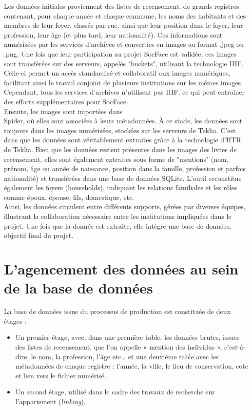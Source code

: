 Les données initiales proviennent des listes de recensement, de grands registres contenant, pour chaque année et chaque commune, les noms des habitants et des membres de leur foyer, classés par rue, ainsi que leur position dans le foyer, leur profession, leur âge (et plus tard, leur nationalité). Ces informations sont numérisées par les services d’archives et converties en images au format .jpeg ou .png. Une fois que leur participation au projet SocFace est validée, ces images sont transférées sur des serveurs, appelés "buckets", utilisant la technologie \gls{IIIF}. Celle-ci permet un accès standardisé et collaboratif aux images numériques, facilitant ainsi le travail conjoint de plusieurs institutions sur les mêmes images. Cependant, tous les services d’archives n’utilisent pas \gls{IIIF}, ce qui peut entraîner des efforts supplémentaires pour SocFace.\\
Ensuite, les images sont importées dans \\Spider{}{}, où elles sont associées à leurs métadonnées. À ce stade, les données sont toujours dans les images numérisées, stockées sur les serveurs de Teklia. C’est dans \Arkindex{} que les données sont véritablement extraites grâce à la technologie d’HTR de Teklia. Bien que les données restent présentes dans les images des livres de recensement, elles sont également extraites sous forme de "mentions" (nom, prénom, âge ou année de naissance, position dans la famille, profession et parfois nationalité) et transférées dans une base de données SQLite. L’outil reconstitue également les foyers (\gls{households}), indiquant les relations familiales et les rôles comme époux, épouse, fils, domestique, etc.\\
Ainsi, les données circulent entre différents supports, gérées par diverses équipes, illustrant la collaboration nécessaire entre les institutions impliquées dans le projet. Une fois que la donnée est extraite, elle intègre une base de données, objectif final du projet.
    
    \section{L'agencement des données au sein de la base de données}

La base de données issue du processus de production est constituée de deux étages : 
\begin{itemize}[label=\textbullet]
    \item Un premier étage, avec, dans une première table, les données brutes, issues des listes de recensement, que l’on appelle « mention des individus », c’est-à-dire, le nom, la profession, l’âge etc…  et une deuxième table avec les métadonnées de chaque registre : l’année, la ville, le lieu de conservation, cote et lien vers le fichier numérisé. 
    \item Un second étage, utilisé dans le cadre des travaux de recherche sur l’appariement (\textit{linking}). 
\end{itemize}
 
